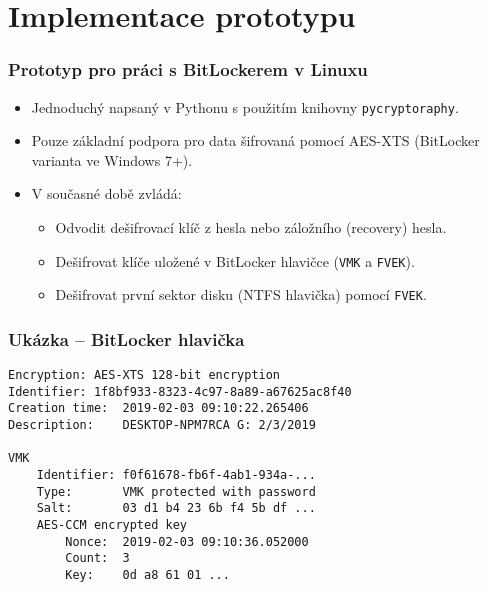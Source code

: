 \documentclass{beamer}
\begin{document}

\section{Implementace prototypu}

\begin{frame}
	\frametitle{Prototyp pro práci s BitLockerem v Linuxu}

	\begin{block}{}
		\begin{itemize}
			\item Jednoduchý  napsaný v Pythonu s použitím knihovny \texttt{pycryptoraphy}.
			\item Pouze základní podpora pro data šifrovaná pomocí AES-XTS (BitLocker varianta ve Windows 7+).
		\end{itemize}
	\end{block}

\vspace{0.5cm}

	\begin{block}{}
		\begin{itemize}
			\item V současné době zvládá:
			\begin{itemize}
				\item Odvodit dešifrovací klíč z hesla nebo záložního (recovery) hesla.
				\item Dešifrovat klíče uložené v BitLocker hlavičce (\texttt{VMK} a \texttt{FVEK}).
				\item Dešifrovat první sektor disku (NTFS hlavička) pomocí \texttt{FVEK}.
			\end{itemize}
		\end{itemize}
	\end{block}

\end{frame}

\begin{frame}[fragile]
	\frametitle{Ukázka -- BitLocker hlavička}

	\begin{lstlisting}
Encryption:	AES-XTS 128-bit encryption
Identifier:	1f8bf933-8323-4c97-8a89-a67625ac8f40
Creation time:	2019-02-03 09:10:22.265406
Description:	DESKTOP-NPM7RCA G: 2/3/2019

VMK
	Identifier:	f0f61678-fb6f-4ab1-934a-...
	Type:		VMK protected with password
	Salt:		03 d1 b4 23 6b f4 5b df ...
	AES-CCM encrypted key
		Nonce:	2019-02-03 09:10:36.052000
		Count:	3
		Key:	0d a8 61 01 ...
	\end{lstlisting}

\end{frame}
\end{document}
